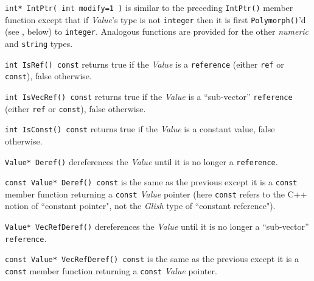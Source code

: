 \begin{sloppy}
\begin{list}{}{}
\item[{\tt int* IntPtr( int modify=1 )}] is
similar to the preceding {\tt IntPtr()}
member function except that if {\em Value\/}'s type is not {\tt integer}
then it is first {\tt Polymorph()}'d (see , below) to
{\tt integer}.  Analogous functions are provided for the other {\em numeric}
and {\tt string} types.

\item[{\tt int IsRef() const}]
returns true if the {\em Value}
is a {\tt reference} (either {\tt ref} or {\tt const}), false otherwise.

\item[{\tt int IsVecRef() const}]
returns true if the {\em Value}
is a ``sub-vector'' {\tt reference} (either {\tt ref} or {\tt const}),
false otherwise.

\item[{\tt int IsConst() const}]
returns true if the {\em Value} is a constant value, false otherwise.

\item[{\tt Value* Deref()}]
dereferences the {\em Value} until it is no
longer a {\tt reference}.

\item[{\tt const Value* Deref() const}]
is the same as the previous except
it is a {\tt const} member function returning a {\tt const} {\em Value}
pointer (here
{\tt const} refers to the C++ notion of ``constant pointer",
not the {\em Glish} type of ``constant reference").

\item[{\tt Value* VecRefDeref()}]
dereferences the {\em Value} until it is no
longer a ``sub-vector'' {\tt reference}.

\item[{\tt const Value* VecRefDeref() const}]
is the same as the previous except
it is a {\tt const} member function returning a {\tt const} {\em Value}
pointer.

\end{list}
\end{sloppy}

